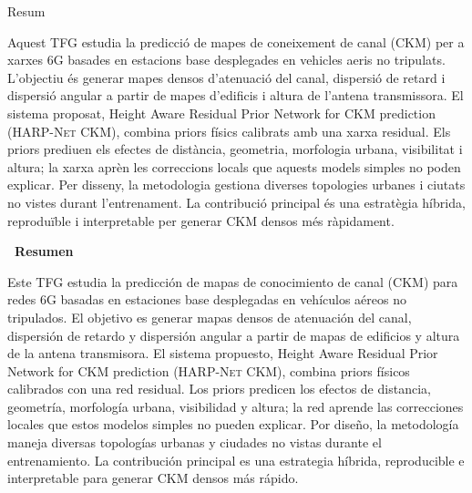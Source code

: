 {}

\begin{center}
  \huge\bfseries\raggedright Resum~\hrulefill
\end{center}
Aquest TFG estudia la predicció de mapes de coneixement de canal (CKM) per a
xarxes 6G basades en estacions base desplegades en vehicles aeris no tripulats.
L'objectiu és generar mapes densos d'atenuació del canal, dispersió de retard i
dispersió angular a partir de mapes d'edificis i altura de l'antena transmissora.
El sistema proposat, Height Aware Residual Prior Network for CKM prediction
(\textsc{HARP-Net CKM}), combina priors físics calibrats amb una xarxa residual.
Els priors prediuen els efectes de distància, geometria, morfologia urbana,
visibilitat i altura; la xarxa aprèn les correccions locals que aquests models
simples no poden explicar. Per disseny, la metodologia gestiona diverses
topologies urbanes i ciutats no vistes durant l'entrenament. La contribució
principal és una estratègia híbrida, reproduïble i interpretable per generar
CKM densos més ràpidament.

\begin{center}
  \huge\bfseries\raggedleft\vspace*{.5\baselineskip} \hrulefill ~Resumen
\end{center}
Este TFG estudia la predicción de mapas de conocimiento de canal (CKM) para
redes 6G basadas en estaciones base desplegadas en vehículos aéreos no
tripulados. El objetivo es generar mapas densos de atenuación del canal,
dispersión de retardo y dispersión angular a partir de mapas de edificios y
altura de la antena transmisora. El sistema propuesto, Height Aware Residual
Prior Network for CKM prediction (\textsc{HARP-Net CKM}), combina priors físicos
calibrados con una red residual. Los priors predicen los efectos de distancia,
geometría, morfología urbana, visibilidad y altura; la red aprende las
correcciones locales que estos modelos simples no pueden explicar. Por diseño,
la metodología maneja diversas topologías urbanas y ciudades no vistas durante
el entrenamiento. La contribución principal es una estrategia híbrida,
reproducible e interpretable para generar CKM densos más rápido.

